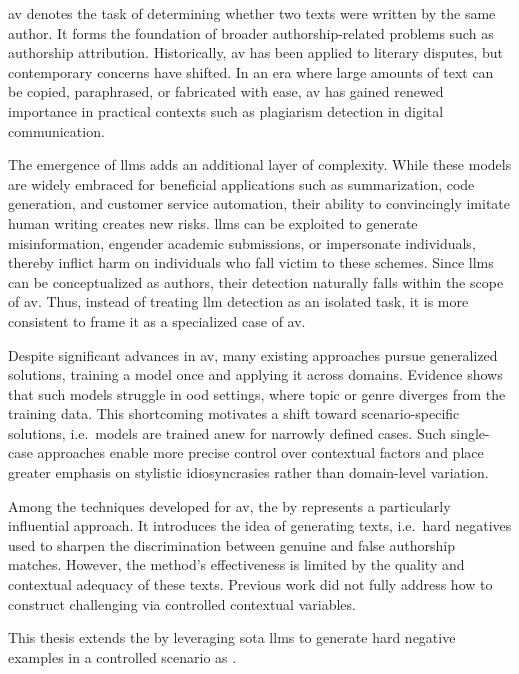 \Acf{av} denotes the task of determining whether two texts were written by the same author. 
It forms the foundation of broader authorship-related problems such as authorship attribution. 
Historically, \ac{av} has been applied to literary disputes, but contemporary concerns have shifted. 
In an era where large amounts of text can be copied, paraphrased, or fabricated with ease, \ac{av} has gained renewed importance in practical contexts such as plagiarism detection in digital communication.

The emergence of \acp{llm} adds an additional layer of complexity. 
While these models are widely embraced for beneficial applications such as summarization, code generation, and customer service automation, their ability to convincingly imitate human writing creates new risks. 
\acp{llm} can be exploited to generate misinformation, engender academic submissions, or impersonate individuals, thereby inflict harm on individuals who fall victim to these schemes. 
Since \acp{llm} can be conceptualized as authors, their detection naturally falls within the scope of \ac{av}. 
Thus, instead of treating \ac{llm} detection as an isolated task, it is more consistent to frame it as a specialized case of \ac{av}.

Despite significant advances in \ac{av}, many existing approaches pursue generalized solutions, training a model once and applying it across domains. 
Evidence shows that such models struggle in \ac{ood} settings, where topic or genre diverges from the training data. 
This shortcoming motivates a shift toward scenario-specific solutions, i.e.\ models are trained anew for narrowly defined cases. 
Such single-case approaches enable more precise control over contextual factors and place greater emphasis on stylistic idiosyncrasies rather than domain-level variation.

Among the techniques developed for \ac{av}, the \impAppr{} by \citet{koppel_determining_2014} represents a particularly influential approach. 
It introduces the idea of generating \imp{} texts, i.e.\ hard negatives used to sharpen the discrimination between genuine and false authorship matches. 
However, the method's effectiveness is limited by the quality and contextual adequacy of these \imp{} texts. 
Previous work did not fully address how to construct challenging \imps{} via controlled contextual variables.

This thesis extends the \impAppr{} by leveraging \acl{sota} \acp{llm} to generate hard negative examples in a controlled scenario as \imps{}. 

